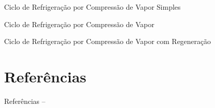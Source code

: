     \begin{frame}{Ciclo de Refrigeração por Compressão de Vapor Simples}\vspace*{-0em}
    \end{frame}

    \begin{frame}{Ciclo de Refrigeração por Compressão de Vapor}\vspace*{-0em}
    \end{frame}

    \begin{frame}{Ciclo de Refrigeração por Compressão de Vapor com Regeneração}\vspace*{-0em}
    \end{frame}


\section{Referências}

    \begin{frame}[allowframebreaks]{Referências -- }
        
        
    \end{frame}




